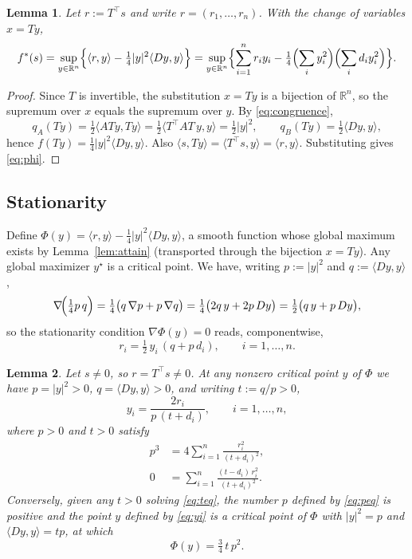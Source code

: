 \documentclass{amsart}
\newtheorem{lemma}{Lemma}
\theoremstyle{definition}
\begin{document}
\begin{lemma}\label{lem:reduce}
Let $r:=T^\top s$ and write $r=(r_1,\dots,r_n)$. With the change of variables $x=Ty$,
\begin{equation}\label{eq:phi}
f^*(s)=\sup_{y\in\mathbb{R}^n}\Bigl\{\langle r,y\rangle-\tfrac14|y|^2\langle Dy,y\rangle\Bigr\}
=\sup_{y\in\mathbb{R}^n}\Bigl\{\sum_{i=1}^n r_i y_i-\tfrac14\Bigl(\sum_i y_i^2\Bigr)\Bigl(\sum_i d_i y_i^2\Bigr)\Bigr\}.
\end{equation}
\end{lemma}

\begin{proof}
Since $T$ is invertible, the substitution $x=Ty$ is a bijection of $\mathbb{R}^n$, so the supremum over $x$ equals the supremum over $y$. By \eqref{eq:congruence},
\[
q_A(Ty)=\tfrac12\langle A Ty,Ty\rangle=\tfrac12\langle T^\top A T\,y,y\rangle=\tfrac12|y|^2,\qquad
q_B(Ty)=\tfrac12\langle Dy,y\rangle,
\]
hence $f(Ty)=\tfrac14|y|^2\langle Dy,y\rangle$. Also $\langle s,Ty\rangle=\langle T^\top s,y\rangle=\langle r,y\rangle$. Substituting gives \eqref{eq:phi}.
\end{proof}

\subsection{Stationarity}

Define $\Phi(y)=\langle r,y\rangle-\tfrac14|y|^2\langle Dy,y\rangle$, a smooth function whose global maximum exists by Lemma~\ref{lem:attain} (transported through the bijection $x=Ty$). Any global maximizer $y^\star$ is a critical point. We have, writing $p:=|y|^2$ and $q:=\langle Dy,y\rangle$,
\[
\nabla\!\Bigl(\tfrac14 p\,q\Bigr)=\tfrac14\bigl(q\,\nabla p+p\,\nabla q\bigr)
=\tfrac14\bigl(2q\,y+2p\,Dy\bigr)=\tfrac12\bigl(q\,y+p\,Dy\bigr),
\]
so the stationarity condition $\nabla\Phi(y)=0$ reads, componentwise,
\begin{equation}\label{eq:stat}
r_i=\tfrac12\,y_i\,(q+p\,d_i),\qquad i=1,\dots,n.
\end{equation}

\begin{lemma}\label{lem:pq}
Let $s\ne 0$, so $r=T^\top s\ne 0$. At any nonzero critical point $y$ of $\Phi$ we have $p=|y|^2>0$, $q=\langle Dy,y\rangle>0$, and writing $t:=q/p>0$,
\begin{equation}\label{eq:yi}
y_i=\frac{2r_i}{p\,(t+d_i)},\qquad i=1,\dots,n,
\end{equation}
where $p>0$ and $t>0$ satisfy
\begin{align}
p^3&=4\sum_{i=1}^n\frac{r_i^2}{(t+d_i)^2},\label{eq:peq}\\
0&=\sum_{i=1}^n\frac{(t-d_i)\,r_i^2}{(t+d_i)^2}.\label{eq:teq}
\end{align}
Conversely, given any $t>0$ solving \eqref{eq:teq}, the number $p$ defined by \eqref{eq:peq} is positive and the point $y$ defined by \eqref{eq:yi} is a critical point of $\Phi$ with $|y|^2=p$ and $\langle Dy,y\rangle=tp$, at which
\begin{equation}\label{eq:critval}
\Phi(y)=\tfrac34\,t\,p^2 .
\end{equation}
\end{lemma}
\end{document}
